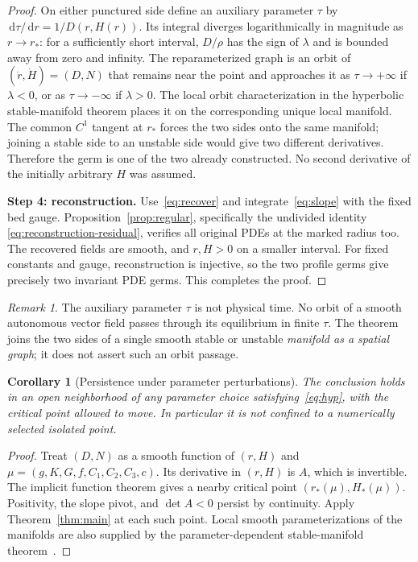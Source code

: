 \documentclass[11pt]{article}
\newtheorem{corollary}[theorem]{Corollary}
\theoremstyle{remark}\newtheorem{remark}[theorem]{Remark}
\newcommand{\dd}{\,\mathrm d}
\begin{document}
\begin{proof}
On either punctured side define an auxiliary parameter $\tau$ by
$\dd\tau/\dd r=1/D(r,H(r))$. Its integral diverges logarithmically in
magnitude as $r\to r_*$: for a sufficiently short interval,
$D/\rho$ has the sign of $\lambda$ and is bounded away from zero and infinity.
The reparameterized graph is an orbit of $(\dot r,\dot H)=(D,N)$ that remains
near the point and approaches it as $\tau\to+\infty$ if $\lambda<0$, or as
$\tau\to-\infty$ if $\lambda>0$. The local orbit characterization in the
hyperbolic stable-manifold theorem places it on the corresponding unique
local manifold. The common $C^1$ tangent at $r_*$ forces the two sides onto
the same manifold; joining a stable side to an unstable side would give two
different derivatives. Therefore the germ is one of the two already
constructed. No second derivative of the initially arbitrary $H$ was assumed.

\textbf{Step 4: reconstruction.}
Use~\eqref{eq:recover} and integrate~\eqref{eq:slope} with the fixed bed gauge.
Proposition~\ref{prop:regular}, specifically the undivided identity
\eqref{eq:reconstruction-residual}, verifies all original PDEs at the marked
radius too. The recovered fields are smooth, and $r,H>0$ on a smaller interval.
For fixed constants and gauge, reconstruction is injective, so the two profile
germs give precisely two invariant PDE germs. This completes the proof.
\end{proof}

\begin{remark}
The auxiliary parameter $\tau$ is not physical time. No orbit of a smooth
autonomous vector field passes through its equilibrium in finite $\tau$.
The theorem joins the two sides of a single smooth stable or unstable
\emph{manifold as a spatial graph}; it does not assert such an orbit passage.
\end{remark}

\begin{corollary}[Persistence under parameter perturbations]\label{cor:persist}
The conclusion holds in an open neighborhood of any parameter choice
satisfying~\eqref{eq:hyp}, with the critical point allowed to move. In
particular it is not confined to a numerically selected isolated point.
\end{corollary}
\begin{proof}
Treat $(D,N)$ as a smooth function of $(r,H)$ and
$\mu=(g,K,G,f,C_1,C_2,C_3,c)$. Its derivative in $(r,H)$ is $A$, which is
invertible. The implicit function theorem gives a nearby critical point
$(r_*(\mu),H_*(\mu))$. Positivity, the slope pivot, and $\det A<0$ persist
by continuity. Apply Theorem~\ref{thm:main} at each such point. Local smooth
parameterizations of the manifolds are also supplied by the parameter-dependent
stable-manifold theorem~\cite[Theorem 9.6, printed p.~260]{teschl}.
\end{proof}
\end{document}
